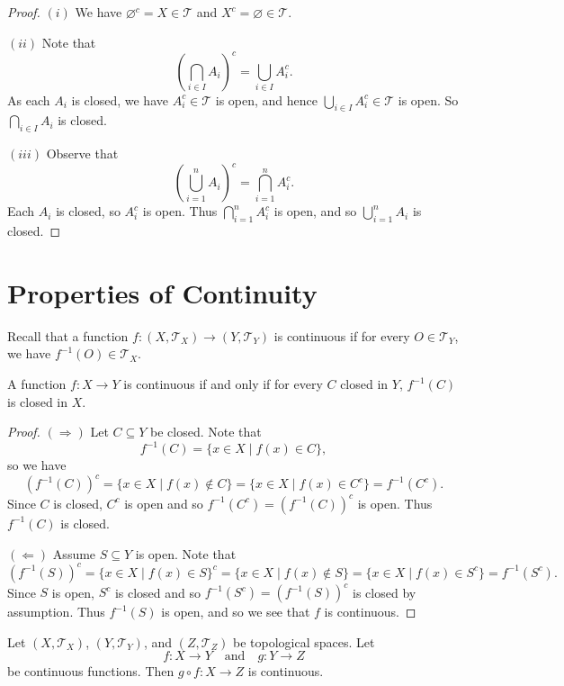 \begin{proof}
  $(i)$ We have $\varnothing^c = X \in \mathcal{T}$
  and $X^c = \varnothing \in \mathcal{T}$.

  $(ii)$ Note that
  \[
    \left( \bigcap_{i \in I} A_i \right)^c
    = \bigcup_{i \in I} A_i^c.
  \]
  As each $A_i$ is closed, we have
  $A_i^c \in \mathcal{T}$ is open, and hence
  $\bigcup_{i \in I} A_i^c \in \mathcal{T}$ is open.
  So $\bigcap_{i \in I} A_i$ is closed.

  $(iii)$ Observe that
  \[
    \left( \bigcup_{i = 1}^n A_i \right)^c
    = \bigcap_{i = 1}^n A_i^c.
  \]
  Each $A_i$ is closed, so $A_i^c$ is open.
  Thus $\bigcap_{i = 1}^n A_i^c$ is open,
  and so $\bigcup_{i = 1}^n A_i$ is closed.
\end{proof}

\section{Properties of Continuity}
Recall that a function $f : (X, \mathcal{T}_X) \to (Y, \mathcal{T}_Y)$
is continuous if for every
$O \in \mathcal{T}_Y$, we have $f^{-1}(O) \in \mathcal{T}_X$.

\begin{theorem}
  A function $f : X \to Y$ is continuous if and
  only if for every $C$ closed in $Y$,
  $f^{-1}(C)$ is closed in $X$.
\end{theorem}

\begin{proof}
  $(\Rightarrow)$ Let $C \subseteq Y$ be closed.
  Note that
  \[
    f^{-1}(C) = \{x \in X \mid f(x) \in C\},
  \]
  so we have
  \[
    (f^{-1}(C))^c = \{x \in X \mid f(x) \notin C\}
    = \{x \in X \mid f(x) \in C^c\}
    = f^{-1}(C^c)
  .\]
  Since $C$ is closed, $C^c$ is open and so
  $f^{-1}(C^c) = (f^{-1}(C))^c$ is open. Thus $f^{-1}(C)$ is closed.

  $(\Leftarrow)$ Assume $S \subseteq Y$ is open.
  Note that
  \[
    (f^{-1}(S))^c
    = \{x \in X \mid f(x) \in S\}^c
    = \{x \in X \mid f(x) \notin S\}
    = \{x \in X \mid f(x) \in S^c\}
    = f^{-1}(S^c).
  \]
  Since $S$ is open, $S^c$ is closed and
  so $f^{-1}(S^c) = (f^{-1}(S))^c$ is closed by
  assumption.
  Thus $f^{-1}(S)$ is open, and so we see that
  $f$ is continuous.
\end{proof}

\begin{theorem}
  Let $(X, \mathcal{T}_X)$, $(Y, \mathcal{T}_Y)$,
  and $(Z, \mathcal{T}_Z)$ be topological spaces.
  Let
  \[f : X \to Y \quad \text{and} \quad g : Y \to Z\]
  be continuous
  functions. Then $g \circ f : X \to Z$
  is continuous.
\end{theorem}

